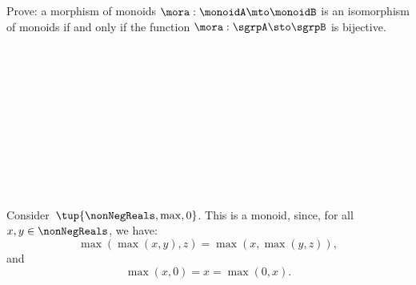 \begin{exercise}
Prove: a morphism of monoids $\mora: \monoidA \mto \monoidB$ is an isomorphism of monoids if and only if the function $\mora: \sgrpA \sto \sgrpB$ is bijective. 
\end{exercise}

\

\

\



\

\

\



\begin{example}
  Consider~$\tup{\nonNegReals,\max,0}$. This is a monoid, since, for all~$x,y\in \nonNegReals$, we have:
  \begin{equation*}
    \max(\max(x,y),z)=\max(x,\max(y,z)),
  \end{equation*}
  and
  \begin{equation*}
    \max(x,0)=x=\max(0,x).
  \end{equation*}
\end{example}



\

\

\



\

\

\


